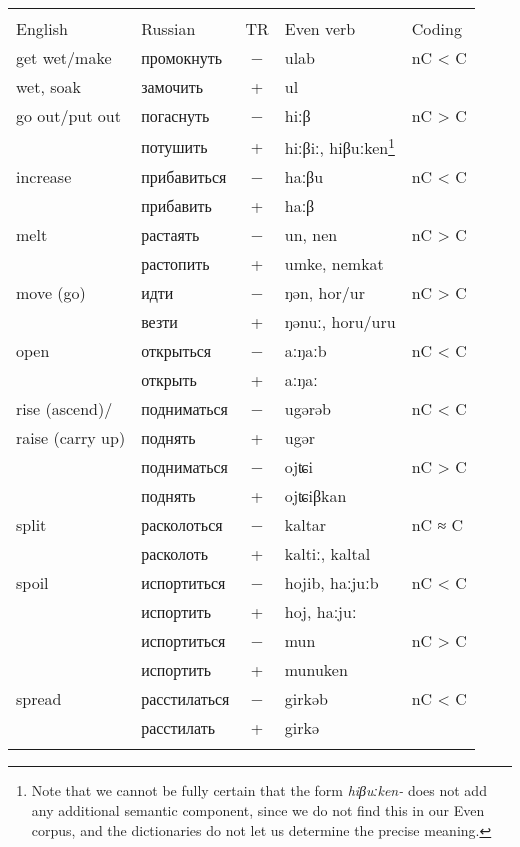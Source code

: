 \documentclass[output=paper,colorlinks,citecolor=brown]{langscibook}
\begin{document}
\begin{paperappendix}
\begin{table}[H]
\begin{tabular}{ l  l c l l}
\lsptoprule
\multicolumn{2}{c}{Verb meaning} & \\\cmidrule(lr){1-2}
English  & Russian &	TR &	Even verb &	Coding\\
\midrule
get wet/make &	промокнуть &	− &	ulab &	nC < C\\
wet, soak &	замочить &	+ &	ul	&\\
\midrule
go out/put out &	погаснуть &	− &	hiːβ &	nC > C\\
& 	потушить &	+ &	hiːβiː, hiβuːken\footnote{Note that we cannot be fully certain that the form \textit{hiβuːken-} does not add any additional semantic component, since we do not find this in our Even corpus, and the dictionaries do not let us determine the precise meaning.}	&\\
\midrule
increase &	прибавиться &	− &	haːβu &	nC < C\\
&	прибавить &	+ &	haːβ &\\
\midrule
melt & 	растаять &	− &	un, nen &	nC > C\\
 &	растопить &	+ &	umke, nemkat 	&\\
\midrule
move (go) &	идти &	− &	ŋən, hor/ur &	nC > C\\
 &	везти &	+ &	ŋənuː, horu/uru 	&\\
\midrule
open &	открыться &	− &	aːŋaːb &	nC < C\\
 &	открыть &	+ &	aːŋaː	&\\
\midrule
rise (ascend)/ &	подниматься &	− &	ugərəb &	nC < C\\
raise (carry up) &	поднять & 	+ &	ugər	&\\
 &	подниматься &	− &	ojʨi &	nC > C\\
 &	поднять & 	+ &	ojʨiβkan	&\\
\midrule
split &	расколоться &	− &	kaltar & 	nC ≈ C\\
 &	расколоть & 	+ &	kaltiː, kaltal	&\\
\midrule
spoil &	испортиться &	− &	hojib, haːjuːb &	nC < C\\
 &	испортить &	+ &	hoj, haːjuː	&\\
 &	испортиться &	− &	mun &	nC > C\\
 &	испортить &	+ &	munuken	&\\
\midrule
spread &	расстилаться &	− &	girkəb & 	nC < C\\
 &	расстилать &	+ &	girkə	&\\
\lspbottomrule
\end{tabular}
\label{table:2Appendix1b}
\end{table}


\end{paperappendix}
\end{document}

